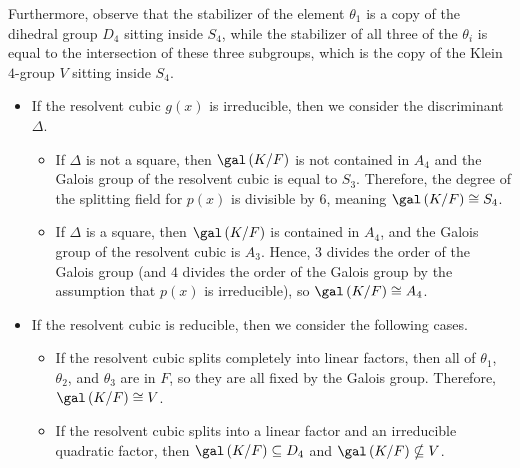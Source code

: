 \documentclass[10pt]{mypackage}
\begin{document}
\begin{itemize}
    Furthermore, observe that the stabilizer of the element $\theta_1$ is a copy of the dihedral group $D_4$ sitting inside $S_4$, while the stabilizer of all three of the $\theta_i$ is equal to the intersection of these three subgroups, which is the copy of the Klein $4$-group $V$ sitting inside $S_4$.
    \begin{itemize}
      \item If the resolvent cubic $g(x)$ is irreducible, then we consider the discriminant $\Delta$.
        \begin{itemize}
          \item If $\Delta$ is not a square, then $\gal\left( K/F \right)$ is not contained in $A_4$ and the Galois group of the resolvent cubic is equal to $S_3$. Therefore, the degree of the splitting field for $p(x)$ is divisible by $6$, meaning $\gal\left( K/F \right)\cong S_4$.
          \item If $\Delta$ is a square, then $\gal\left( K/F \right)$ is contained in $A_4$, and the Galois group of the resolvent cubic is $A_3$. Hence, $3$ divides the order of the Galois group (and $4$ divides the order of the Galois group by the assumption that $p(x)$ is irreducible), so $\gal\left( K/F \right)\cong A_4$.
        \end{itemize}
      \item If the resolvent cubic is reducible, then we consider the following cases.
        \begin{itemize}
          \item If the resolvent cubic splits completely into linear factors, then all of $\theta_1$, $\theta_2$, and $\theta_3$ are in $F$, so they are all fixed by the Galois group. Therefore, $\gal\left( K/F \right)\cong V$.
          \item If the resolvent cubic splits into a linear factor and an irreducible quadratic factor, then $\gal\left( K/F \right)\subseteq D_4$ and $\gal\left( K/F \right)\nsubseteq V$.


\end{itemize}
\end{itemize}
\end{itemize}
\end{document}

